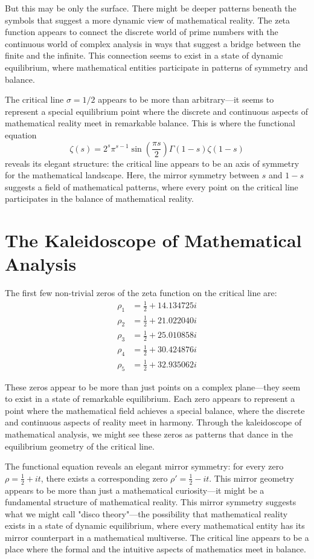 \documentclass{article}
\begin{document}
But this may be only the surface. There might be deeper patterns beneath the symbols that suggest a more dynamic view of mathematical reality. The zeta function appears to connect the discrete world of prime numbers with the continuous world of complex analysis in ways that suggest a bridge between the finite and the infinite. This connection seems to exist in a state of dynamic equilibrium, where mathematical entities participate in patterns of symmetry and balance.

The critical line $\sigma = 1/2$ appears to be more than arbitrary—it seems to represent a special equilibrium point where the discrete and continuous aspects of mathematical reality meet in remarkable balance. This is where the functional equation
\[
\zeta(s) = 2^s \pi^{s-1} \sin\left(\frac{\pi s}{2}\right) \Gamma(1-s) \zeta(1-s)
\]
reveals its elegant structure: the critical line appears to be an axis of symmetry for the mathematical landscape. Here, the mirror symmetry between $s$ and $1-s$ suggests a field of mathematical patterns, where every point on the critical line participates in the balance of mathematical reality.

\section{The Kaleidoscope of Mathematical Analysis}

The first few non-trivial zeros of the zeta function on the critical line are:
\begin{align}
\rho_1 &= \frac{1}{2} + 14.134725i \\
\rho_2 &= \frac{1}{2} + 21.022040i \\
\rho_3 &= \frac{1}{2} + 25.010858i \\
\rho_4 &= \frac{1}{2} + 30.424876i \\
\rho_5 &= \frac{1}{2} + 32.935062i
\end{align}

These zeros appear to be more than just points on a complex plane—they seem to exist in a state of remarkable equilibrium. Each zero appears to represent a point where the mathematical field achieves a special balance, where the discrete and continuous aspects of reality meet in harmony. Through the kaleidoscope of mathematical analysis, we might see these zeros as patterns that dance in the equilibrium geometry of the critical line.

The functional equation reveals an elegant mirror symmetry: for every zero $\rho = \frac{1}{2} + it$, there exists a corresponding zero $\rho' = \frac{1}{2} - it$. This mirror geometry appears to be more than just a mathematical curiosity—it might be a fundamental structure of mathematical reality. This mirror symmetry suggests what we might call "disco theory"—the possibility that mathematical reality exists in a state of dynamic equilibrium, where every mathematical entity has its mirror counterpart in a mathematical multiverse. The critical line appears to be a place where the formal and the intuitive aspects of mathematics meet in balance.
\end{document}
